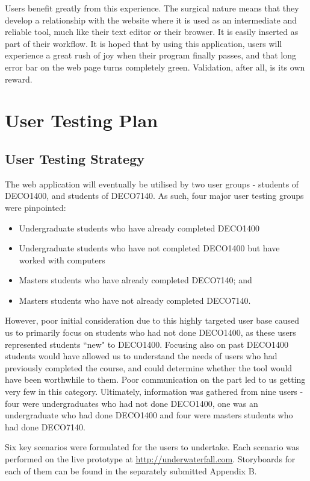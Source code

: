 \documentclass[10pt]{article}
\begin{document}
Users benefit greatly from this experience. The surgical nature means that they develop a relationship with the website where it is used as an intermediate and reliable tool, much like their text editor or their browser. It is easily inserted as part of their workflow. It is hoped that by using this application, users will experience a great rush of joy when their program finally passes, and that long error bar on the web page turns completely green. Validation, after all, is its own reward.

\newpage

\section{User Testing Plan}

\subsection{User Testing Strategy}

The web application will eventually be utilised by two user groups - students of DECO1400, and students of DECO7140. As such, four major user testing groups were pinpointed:

\begin{itemize}
\item Undergraduate students who have already completed DECO1400
\item Undergraduate students who have not completed DECO1400 but have worked with computers
\item Masters students who have already completed DECO7140; and
\item Masters students who have not already completed DECO7140.
\end{itemize}

However, poor initial consideration due to this highly targeted user base caused us to primarily focus on students who had not done DECO1400, as these users represented students ``new" to DECO1400. Focusing also on past DECO1400 students would have allowed us to understand the needs of users who had previously completed the course, and could determine whether the tool would have been worthwhile to them. Poor communication on the part led to us getting very few in this category. Ultimately, information was gathered from nine users - four were undergraduates who had not done DECO1400, one was an undergraduate who had done DECO1400 and four were masters students who had done DECO7140.

Six key scenarios were formulated for the users to undertake. Each scenario was performed on the live prototype at \underline{\url{http://underwaterfall.com}}. Storyboards for each of them can be found in the separately submitted Appendix B.
\end{document}
